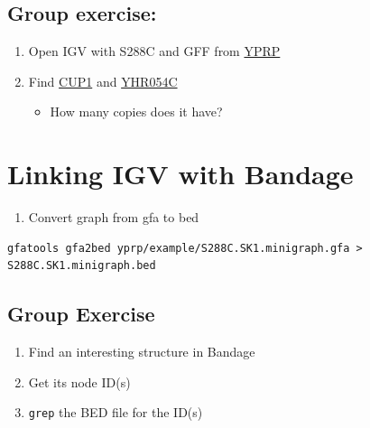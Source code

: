 \documentclass[
]{book}
\providecommand{\tightlist}{%
  \setlength{\itemsep}{0pt}\setlength{\parskip}{0pt}}
\begin{document}
\hypertarget{group-exercise-1}{%
\subsection*{\texorpdfstring{\textbf{Group exercise:}}{Group exercise:}}\label{group-exercise-1}}

\begin{enumerate}
\def\labelenumi{\arabic{enumi}.}
\tightlist
\item
  Open IGV with S288C and GFF from \href{https://yjx1217.github.io/Yeast_PacBio_2016/data/}{YPRP}
\item
  Find \href{https://www.yeastgenome.org/locus/S000001095}{CUP1} and \href{https://www.yeastgenome.org/locus/S000001096}{YHR054C}

  \begin{itemize}
  \tightlist
  \item
    How many copies does it have?
  \end{itemize}
\end{enumerate}

\hypertarget{linking-igv-with-bandage}{%
\section{Linking IGV with Bandage}\label{linking-igv-with-bandage}}

\begin{enumerate}
\def\labelenumi{\arabic{enumi}.}
\tightlist
\item
  Convert graph from gfa to bed
\end{enumerate}

\begin{verbatim}
gfatools gfa2bed yprp/example/S288C.SK1.minigraph.gfa > S288C.SK1.minigraph.bed
\end{verbatim}

\hypertarget{group-exercise-2}{%
\subsection*{\texorpdfstring{\textbf{Group Exercise}}{Group Exercise}}\label{group-exercise-2}}

\begin{enumerate}
\def\labelenumi{\arabic{enumi}.}
\tightlist
\item
  Find an interesting structure in Bandage
\item
  Get its node ID(s)
\item
  \texttt{grep} the BED file for the ID(s)
\end{enumerate}
\end{document}
